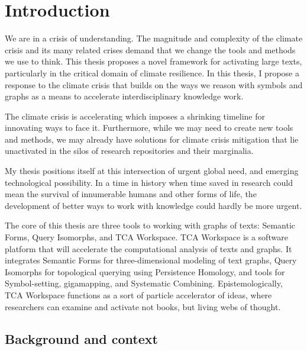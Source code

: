 \chapter{Introduction}

We are in a crisis of understanding. The magnitude and complexity of the climate crisis and its many related crises demand that we change the tools and methods we use to think. This thesis proposes a novel framework for activating large texts, particularly in the critical domain of climate resilience. In this thesis, I propose a response to the climate crisis that builds on the ways we reason with symbols and graphs as a means to accelerate interdisciplinary knowledge work. 

The climate crisis is accelerating which imposes a shrinking timeline for innovating ways to face it. Furthermore, while we may need to create new tools and methods, we may already have solutions for climate crisis mitigation that lie unactivated in the silos of research repositories and their marginalia.

My thesis positions itself at this intersection of urgent global need, and emerging technological possibility. In a time in history when time saved in research could mean the survival of innumerable humans and other forms of life, the development of better ways to work with knowledge could hardly be more urgent. 

The core of this thesis are three tools to working with graphs of texts: Semantic Forms, Query Isomorphs, and TCA Workspace. TCA Workspace is a software platform that will accelerate the computational analysis of texts and graphs. It integrates Semantic Forms for three-dimensional modeling of text graphs, Query Isomorphs for topological querying using Persistence Homology, and tools for Symbol-setting, gigamapping, and Systematic Combining. Epistemologically, TCA Workspace functions as a sort of particle accelerator of ideas, where researchers can examine and activate not books, but living webs of thought.



\section{Background and context}

